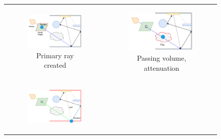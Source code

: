 \renewcommand\thesubfigure{\arabic{subfigure}}
\begin{figure}
	\begin{tabular}{cc}
		\begin{subfigure}
			{0.45\textwidth}\centering\includegraphics[width=\linewidth]{img/path_tracer_step1.pdf}
			\caption{Primary ray created}
		\end{subfigure}
		&
		\begin{subfigure}
			{0.45\textwidth}\centering\includegraphics[width=\linewidth]{img/path_tracer_step2.pdf}
			\caption{Passing volume, attenuation}
		\end{subfigure} \\
		\begin{subfigure}
			{0.45\textwidth}\centering\includegraphics[width=\linewidth]{img/path_tracer_step3.pdf}

\end{subfigure}
\end{tabular}
\end{figure}

